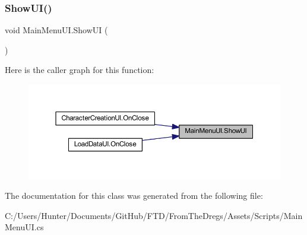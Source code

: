 \subsubsection{\texorpdfstring{ShowUI()}{ShowUI()}}
{\footnotesize\ttfamily void Main\+Menu\+U\+I.\+Show\+UI (\begin{DoxyParamCaption}{ }\end{DoxyParamCaption})}

Here is the caller graph for this function\+:
\nopagebreak
\begin{figure}[H]
\begin{center}
\leavevmode
\includegraphics[width=350pt]{class_main_menu_u_i_ab70d817a22e65d2258cfd0d9a48404a8_icgraph}
\end{center}
\end{figure}


The documentation for this class was generated from the following file\+:\begin{DoxyCompactItemize}
\item 
C\+:/\+Users/\+Hunter/\+Documents/\+Git\+Hub/\+F\+T\+D/\+From\+The\+Dregs/\+Assets/\+Scripts/Main\+Menu\+U\+I.\+cs\end{DoxyCompactItemize}
